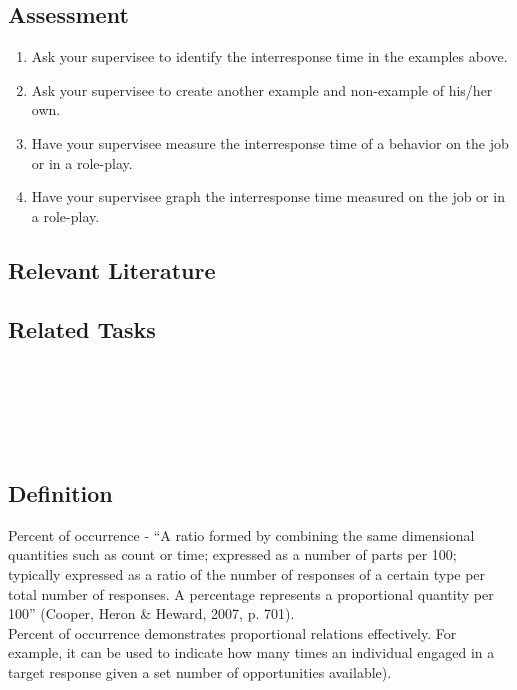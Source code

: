 \subsection{Assessment}
\begin{enumerate}
\item Ask your supervisee to identify the interresponse time in the examples above. 
\item Ask your supervisee to create another example and non-example of his/her own. 
\item Have your supervisee measure the interresponse time of a behavior on the job or in a role-play. 
\item Have your supervisee graph the interresponse time measured on the job or in a role-play.
\end{enumerate}
%
\subsection{Relevant Literature}
\begin{refsection}
\nocite{blough1963interresponse,cooper2007applied,favell1980rapid}
\printbibliography[heading=none]
\end{refsection}
%
\subsection{Related Tasks}
\fouraFive{}\\
\fouriOne{}\\
\fourhOne{}\\
\fourFKFourtySeven{}\\
%
%
%
%
\section{\fouraSix{}}
\subsection{Definition}
Percent of occurrence - ``A ratio formed by combining the same dimensional quantities such as count or time; expressed as a number of parts per 100; typically expressed as a ratio of the number of responses of a certain type per total number of responses. A percentage represents a proportional quantity per 100'' (Cooper, Heron \& Heward, 2007, p. 701).\\

Percent of occurrence demonstrates proportional relations effectively. For example, it can be used to indicate how many times an individual engaged in a target response given a set number of opportunities available).\\

